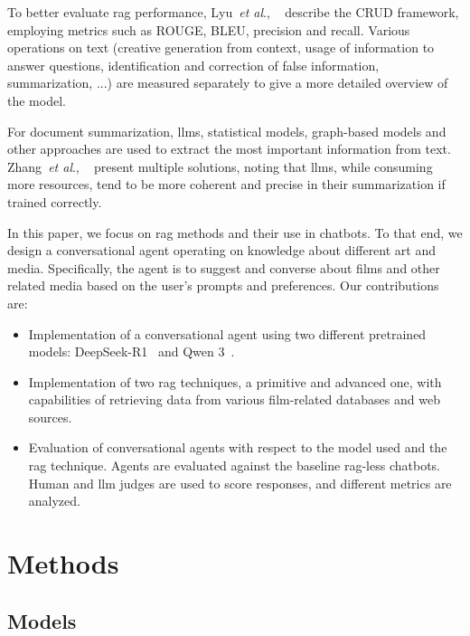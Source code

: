 \documentclass[fleqn,moreauthors,10pt]{ds_report}
\newcommand{\etal}{\textit{et al}., }
\begin{document}
To better evaluate \ac{rag} performance, Lyu~\etal~\cite{benchmark} describe the CRUD framework, employing metrics such as ROUGE, BLEU, precision and recall. Various operations on text (creative generation from context, usage of information to answer questions, identification and correction of false information, summarization, ...) are measured separately to give a more detailed overview of the model. 

For document summarization, \acp{llm}, statistical models, graph-based models and other approaches are used to extract the most important information from text. Zhang~\etal~\cite{summarization} present multiple solutions, noting that \acp{llm}, while consuming more resources, tend to be more coherent and precise in their summarization if trained correctly.

In this paper, we focus on \ac{rag} methods and their use in chatbots. To that end, we design a conversational agent operating on knowledge about different art and media. Specifically, the agent is to suggest and converse about films and other related media based on the user’s prompts and preferences. Our contributions are:

\begin{itemize}
	\item Implementation of a conversational agent using two different pretrained models: DeepSeek-R1~\cite{deepseek3} and Qwen 3~\cite{qwen3}.
	\item Implementation of two \ac{rag} techniques, a primitive and advanced one, with capabilities of retrieving data from various film-related databases and web sources.
	\item Evaluation of conversational agents with respect to the model used and the \ac{rag} technique. Agents are evaluated against the baseline \ac{rag}-less chatbots. Human and \ac{llm} judges are used to score responses, and different metrics are analyzed.
\end{itemize}


\section*{Methods}


\subsection*{Models}
\end{document}
